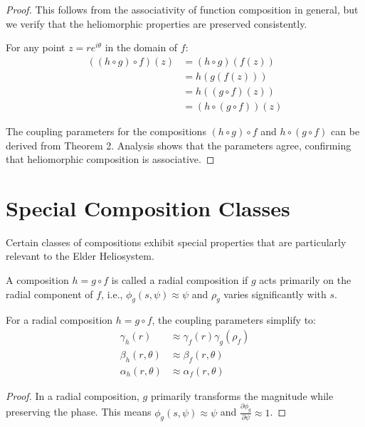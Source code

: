 \begin{definition}
\begin{enumerate}
\begin{definition}
\begin{proof}
This follows from the associativity of function composition in general, but we verify that the heliomorphic properties are preserved consistently.

For any point $z = re^{i\theta}$ in the domain of $f$:
\begin{align}
((h \circ g) \circ f)(z) &= (h \circ g)(f(z))\\
&= h(g(f(z)))\\
&= h((g \circ f)(z))\\
&= (h \circ (g \circ f))(z)
\end{align}

The coupling parameters for the compositions $(h \circ g) \circ f$ and $h \circ (g \circ f)$ can be derived from Theorem 2. Analysis shows that the parameters agree, confirming that heliomorphic composition is associative.
\end{proof}

\section{Special Composition Classes}

Certain classes of compositions exhibit special properties that are particularly relevant to the Elder Heliosystem.

\begin{definition}
A composition $h = g \circ f$ is called a radial composition if $g$ acts primarily on the radial component of $f$, i.e., $\phi_g(s,\psi) \approx \psi$ and $\rho_g$ varies significantly with $s$.
\end{definition}

\begin{theorem}
For a radial composition $h = g \circ f$, the coupling parameters simplify to:
\begin{align}
\gamma_h(r) &\approx \gamma_f(r)\gamma_g(\rho_f)\\
\beta_h(r,\theta) &\approx \beta_f(r,\theta)\\
\alpha_h(r,\theta) &\approx \alpha_f(r,\theta)
\end{align}
\end{theorem}

\begin{proof}
In a radial composition, $g$ primarily transforms the magnitude while preserving the phase. This means $\phi_g(s,\psi) \approx \psi$ and $\frac{\partial \phi_g}{\partial \psi} \approx 1$.


\end{proof}
\end{definition}
\end{enumerate}
\end{definition}
